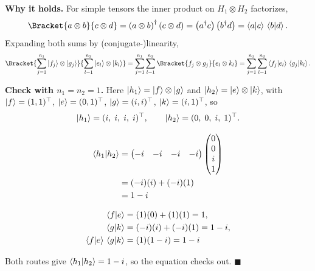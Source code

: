 \documentclass[a4paper, 10pt]{article}
\begin{document}
\begin{solution}
	\noindent \textbf{Why it holds.} For simple tensors the inner product on \( H_1 \otimes H_2 \) factorizes,
	\[
		\Bracket{a \otimes b}{c \otimes d}
		= \paren{a \otimes b}^{\dagger}\paren{c \otimes d}
		= \paren{a^{\dagger}c}\paren{b^{\dagger}d}
		= \braket{a \vert c}\,\braket{b \vert d}.
	\]
	Expanding both sums by (conjugate-)linearity,
	\[
		\Bracket{\sum_{j = 1}^{n_1} \ket{f_j} \otimes \ket{g_j}}{\sum_{l = 1}^{n_2} \ket{e_l} \otimes \ket{k_l}}
		= \sum_{j = 1}^{n_1} \sum_{l = 1}^{n_2} \Bracket{f_j \otimes g_j}{e_l \otimes k_l}
		= \sum_{j = 1}^{n_1} \sum_{l = 1}^{n_2} \braket{f_j \vert e_l}\,\braket{g_j \vert k_l}.
	\]

	\noindent \textbf{Check with \( n_1 = n_2 = 1 \).} Here \( \ket{h_1} = \ket{f} \otimes \ket{g} \) and \( \ket{h_2} = \ket{e} \otimes \ket{k} \), with \( \ket{f} = (1,1)^{\top} \), \( \ket{e} = (0,1)^{\top} \), \( \ket{g} = (i,i)^{\top} \), \( \ket{k} = (i,1)^{\top} \), so
	\[
		\ket{h_1} = (i,\; i,\; i,\; i)^{\top}, \qquad
		\ket{h_2} = (0,\; 0,\; i,\; 1)^{\top}.
	\]

	\noindent
	\begin{minipage}[t]{0.46\textwidth}
		\begin{align*}
			\braket{h_1 \vert h_2}
			 & = \begin{pmatrix} -i & -i & -i & -i \end{pmatrix}\begin{pmatrix} 0 \\ 0 \\ i \\ 1 \end{pmatrix} \\
			 & = (-i)(i) + (-i)(1)                                                                             \\
			 & = 1 - i
		\end{align*}
	\end{minipage}%
	\hfill \vrule \hfill
	\begin{minipage}[t]{0.46\textwidth}
		\begin{align*}
			\braket{f \vert e}                     & = (1)(0) + (1)(1) = 1,       \\
			\braket{g \vert k}                     & = (-i)(i) + (-i)(1) = 1 - i, \\
			\braket{f \vert e}\,\braket{g \vert k} & = (1)(1 - i) = 1 - i
		\end{align*}
	\end{minipage}

	\myspace

	\noindent Both routes give \( \braket{h_1 \vert h_2} = 1 - i \), so the equation checks out. \( \blacksquare \)
\end{solution}
\end{document}
